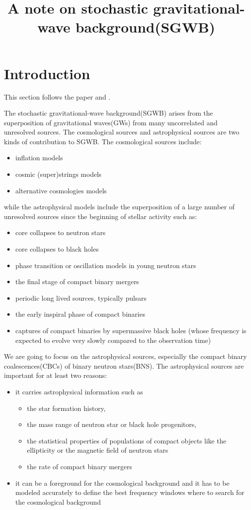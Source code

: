 \documentclass[11pt, a4paper]{article}
\title{A note on stochastic gravitational-wave background(SGWB)}
\begin{document}
\maketitle

\section{Introduction}\label{sec:intro}
\quad 

This section follows the paper\cite{Mandic2012} and \cite{Regimbau2008}.

The stochastic gravitational-wave background(SGWB) arises from the superposition of gravitational waves(GWs) from many uncorrelated and unresolved sources. The cosmological sources and astrophysical sources are two kinds of contribution to SGWB. The cosmological sources include:
\begin{itemize}
\item inflation models
\item cosmic (super)strings models
\item alternative cosmologies models
\end{itemize}
while the astrophysical models include the superposition of a large number of unresolved sources since the beginning of stellar activity such as:
\begin{itemize}
\item core collapses to neutron stars
\item core collapses to black holes
\item phase transition or oscillation models in young neutron stars
\item the final stage of compact binary mergers
\item periodic long lived sources, typically pulsars
\item the early inspiral phase of compact binaries
\item captures of compact binaries by supermassive black holes (whose frequency is expected to evolve very slowly compared to the observation time)
\end{itemize}

We are going to focus on the astrophysical sources, especially the compact binary coalescences(CBCs) of binary neutron stars(BNS). The astrophysical sources are important for at least two reasons:
\begin{itemize}
\item it carries astrophysical information such as
\begin{itemize}
\item the star formation history,
\item the mass range of neutron star or black hole progenitors,
\item the statistical properties of populations of compact objects like the ellipticity or the magnetic field of neutron stars 
\item the rate of compact binary mergers
\end{itemize}
\item it can be a foreground for the cosmological background and it has to be modeled accurately to define the best frequency windows where to search for the cosmological background
\end{itemize}
\end{document}
